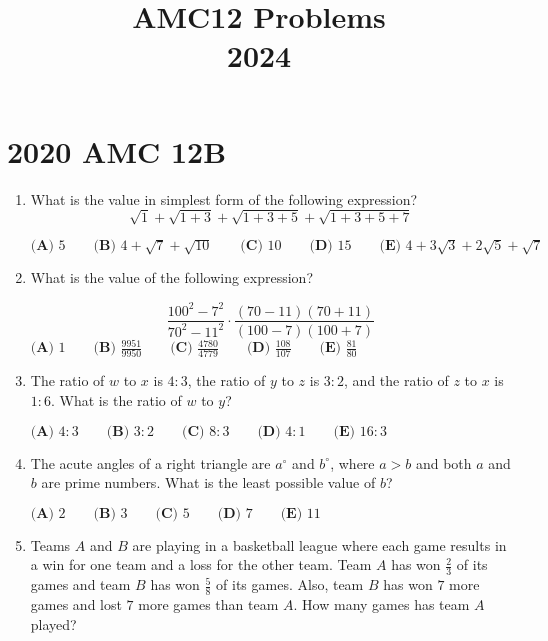 \documentclass{article}
\title{AMC12 Problems \\ 2024}
\date{}
\begin{document}
\maketitle\thispagestyle{fancy}\newpage\section*{2020 AMC 12B}\begin{enumerate}[label=\arabic*., itemsep=0.5em]\item What is the value in simplest form of the following expression?
\begin{equation*}
\sqrt{1} + \sqrt{1+3} + \sqrt{1+3+5} + \sqrt{1+3+5+7}
\end{equation*}


\(\textbf{(A) }5 \qquad \textbf{(B) }4 + \sqrt{7} + \sqrt{10} \qquad \textbf{(C) } 10 \qquad \textbf{(D) } 15 \qquad \textbf{(E) } 4 + 3\sqrt{3} + 2\sqrt{5} + \sqrt{7}\)\par \vspace{0.5em}\item What is the value of the following expression?

\begin{equation*}
\frac{100^2-7^2}{70^2-11^2} \cdot \frac{(70-11)(70+11)}{(100-7)(100+7)}
\end{equation*}
\(\textbf{(A) } 1 \qquad \textbf{(B) } \frac{9951}{9950} \qquad \textbf{(C) } \frac{4780}{4779} \qquad \textbf{(D) } \frac{108}{107} \qquad \textbf{(E) } \frac{81}{80} \)\par \vspace{0.5em}\item The ratio of \(w\) to \(x\) is \(4 : 3\), the ratio of \(y\) to \(z\) is \(3 : 2\), and the ratio of \(z\) to \(x\) is \(1 : 6\). What is the ratio of \(w\) to \(y\)?

\(\textbf{(A) }4:3 \qquad \textbf{(B) }3:2 \qquad \textbf{(C) } 8:3 \qquad \textbf{(D) } 4:1 \qquad \textbf{(E) } 16:3 \)\par \vspace{0.5em}\item The acute angles of a right triangle are \(a^{\circ}\) and \(b^{\circ}\), where \(a>b\) and both \(a\) and \(b\) are prime numbers. What is the least possible value of \(b\)?

\(\textbf{(A) }2\qquad\textbf{(B) }3\qquad\textbf{(C) }5\qquad\textbf{(D) }7\qquad\textbf{(E) }11\)\par \vspace{0.5em}\item Teams \(A\) and \(B\) are playing in a basketball league where each game results in a win for one team and a loss for the other team. Team \(A\) has won \(\tfrac{2}{3}\) of its games and team \(B\) has won \(\tfrac{5}{8}\) of its games. Also, team \(B\) has won \(7\) more games and lost \(7\) more games than team \(A.\) How many games has team \(A\) played?


\end{enumerate}
\end{document}
